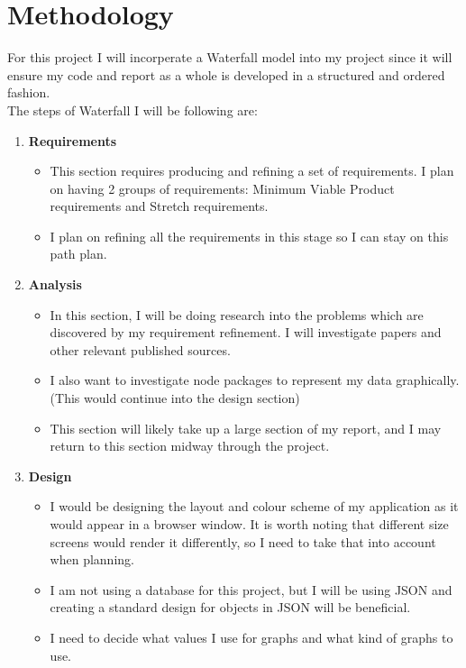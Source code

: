 \documentclass{report}
\begin{document}
\chapter{Methodology}
For this project I will incorperate a Waterfall model into my project since it will ensure my code and report as a whole is developed in a structured and ordered fashion.\\
The steps of Waterfall I will be following are:
\begin{enumerate}
    \item \textbf{\large{Requirements}}
    \begin{itemize}
        \item This section requires producing and refining a set of requirements. I plan on having 2 groups of requirements: Minimum Viable Product requirements and Stretch requirements.
        \item I plan on refining all the requirements in this stage so I can stay on this path plan.
    \end{itemize}
    \item \textbf{\large{Analysis}}
    \begin{itemize}
        \item In this section, I will be doing research into the problems which are discovered by my requirement refinement. I will investigate papers and other relevant published sources.
        \item I also want to investigate node packages to represent my data graphically. (This would continue into the design section)
        \item This section will likely take up a large section of my report, and I may return to this section midway through the project.
    \end{itemize}
    \item \textbf{\large{Design}}
    \begin{itemize}
        \item I would be designing the layout and colour scheme of my application as it would appear in a browser window. It is worth noting that different size screens would render it differently, so I need to take that into account when planning.
        \item I am not using a database for this project, but I will be using JSON and creating a standard design for objects in JSON will be beneficial.
        \item I need to decide what values I use for graphs and what kind of graphs to use.
    \end{itemize}

\end{enumerate}
\end{document}
